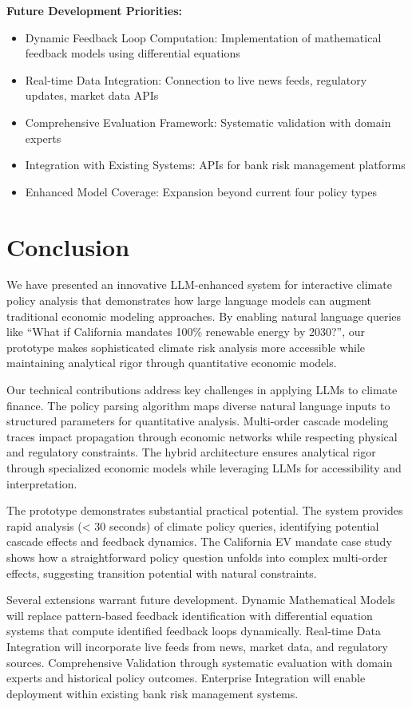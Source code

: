 \documentclass[conference]{IEEEtran}
\begin{document}
\textbf{Future Development Priorities:}
\begin{itemize}
\item Dynamic Feedback Loop Computation: Implementation of mathematical feedback models using differential equations
\item Real-time Data Integration: Connection to live news feeds, regulatory updates, market data APIs
\item Comprehensive Evaluation Framework: Systematic validation with domain experts
\item Integration with Existing Systems: APIs for bank risk management platforms
\item Enhanced Model Coverage: Expansion beyond current four policy types
\end{itemize}

\section{Conclusion}

We have presented an innovative LLM-enhanced system for interactive climate policy analysis that demonstrates how large language models can augment traditional economic modeling approaches. By enabling natural language queries like ``What if California mandates 100\% renewable energy by 2030?'', our prototype makes sophisticated climate risk analysis more accessible while maintaining analytical rigor through quantitative economic models.

Our technical contributions address key challenges in applying LLMs to climate finance. The policy parsing algorithm maps diverse natural language inputs to structured parameters for quantitative analysis. Multi-order cascade modeling traces impact propagation through economic networks while respecting physical and regulatory constraints. The hybrid architecture ensures analytical rigor through specialized economic models while leveraging LLMs for accessibility and interpretation.

The prototype demonstrates substantial practical potential. The system provides rapid analysis (< 30 seconds) of climate policy queries, identifying potential cascade effects and feedback dynamics. The California EV mandate case study shows how a straightforward policy question unfolds into complex multi-order effects, suggesting transition potential with natural constraints.

Several extensions warrant future development. Dynamic Mathematical Models will replace pattern-based feedback identification with differential equation systems that compute identified feedback loops dynamically. Real-time Data Integration will incorporate live feeds from news, market data, and regulatory sources. Comprehensive Validation through systematic evaluation with domain experts and historical policy outcomes. Enterprise Integration will enable deployment within existing bank risk management systems.
\end{document}
